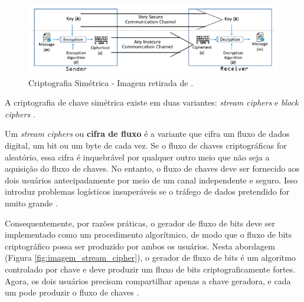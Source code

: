             \begin{figure}[h]
                 \centering
                 \includegraphics[scale=0.6]{figuras/capitulo_2/criptografia_simetrica.png}
                 \caption{Criptografia Simétrica - Imagem retirada de \cite{beginnig_blockchain_bikramaditya}.}
                 \label{fig:imagem_criptografia_simetrica}
            \end{figure}
            
            A criptografia de chave simétrica existe em duas variantes: \textit{stream ciphers} e \textit{block ciphers} \cite{beginnig_blockchain_bikramaditya}.
            
            Um \textit{stream ciphers} ou \textbf{cifra de fluxo} é a variante que cifra um fluxo de dados digital, um bit ou um byte de cada vez. Se o fluxo de chaves criptográficas for aleatório, essa cifra é inquebrável por qualquer outro meio que não seja a aquisição do fluxo de chaves. No entanto, o fluxo de chaves deve ser fornecido aos dois usuários antecipadamente por meio de um canal independente e seguro. Isso introduz problemas logísticos insuperáveis se o tráfego de dados pretendido for muito grande \cite{cryptograpy_and_network_stallings}.
            
            Consequentemente, por razões práticas, o gerador de fluxo de bits deve ser implementado como um procedimento algorítmico, de modo que o fluxo de bits criptográfico possa ser produzido por ambos os usuários. Nesta abordagem (Figura \ref{fig:imagem_stream_cipher}), o gerador de fluxo de bits é um algoritmo controlado por chave e deve produzir um fluxo de bits criptograficamente fortes. Agora, os dois usuários precisam compartilhar apenas a chave geradora, e cada um pode produzir o fluxo de chaves \cite{cryptograpy_and_network_stallings}.
        
